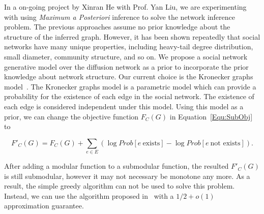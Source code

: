 In a on-going project by Xinran He with Prof. Yan Liu, we are experimenting with using \textit{Maximum a Posteriori} inference to solve the network inference problem. The previous approaches assume no prior knowledge about the structure of the inferred graph. However, it has been shown repeatedly that social networks have many unique properties, including heavy-tail degree distribution, small diameter, community structure, and so on. We propose a social network generative model over the diffusion network as a prior to incorporate the prior knowledge about network structure. Our current choice is the Kronecker graphs model~\cite{JDJCZ10,KJ11}. The Kronecker graphs model is a parametric model which can provide a probability for the existence of each edge in the social network. The existence of each edge is considered independent under this model. Using this model as a prior, we can change the objective function $F_C(G)$ in Equation~\ref{Equ:SubObj} to

\[
F'_C(G) = F_C(G) + \sum_{e\in E}(\log Prob[e\ \text{exists}]-\log Prob[e\ \text{not exists}]).
\]

After adding a modular function to a submodular function, the resulted $F'_C(G)$ is still submodular, however it may not necessary be monotone any more. As a result, the simple greedy algorithm can not be used to solve this problem. Instead, we can use the algorithm proposed in~\cite{FeldmanNS11} with a $1/2+o(1)$ approximation guarantee.
